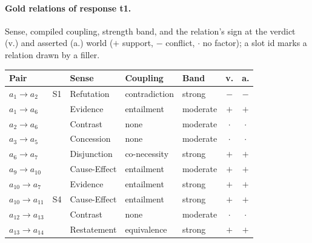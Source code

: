 \paragraph{Gold relations of response t1.} Sense, compiled coupling, strength band, and the relation's sign at the verdict (v.) and asserted (a.) world ($+$ support, $-$ conflict, $\cdot$ no factor); a slot id marks a relation drawn by a filler.

\begin{center}\scriptsize
\setlength{\tabcolsep}{2.2pt}
\begin{tabular}{@{}lllllcc@{}}
\toprule
Pair & & Sense & Coupling & Band & v. & a. \\
\midrule
$a_{1}\to a_{2}$ & S1 & Refutation & contradiction & strong & $-$ & $-$ \\
$a_{1}\to a_{6}$ &  & Evidence & entailment & moderate & $+$ & $+$ \\
$a_{2}\to a_{6}$ &  & Contrast & none & moderate & $\cdot$ & $\cdot$ \\
$a_{3}\to a_{5}$ &  & Concession & none & moderate & $\cdot$ & $\cdot$ \\
$a_{6}\to a_{7}$ &  & Disjunction & co-necessity & strong & $+$ & $+$ \\
$a_{9}\to a_{10}$ &  & Cause-Effect & entailment & moderate & $+$ & $+$ \\
$a_{10}\to a_{7}$ &  & Evidence & entailment & strong & $+$ & $+$ \\
$a_{10}\to a_{11}$ & S4 & Cause-Effect & entailment & strong & $+$ & $+$ \\
$a_{12}\to a_{13}$ &  & Contrast & none & moderate & $\cdot$ & $\cdot$ \\
$a_{13}\to a_{14}$ &  & Restatement & equivalence & strong & $+$ & $+$ \\
\bottomrule
\end{tabular}
\end{center}
